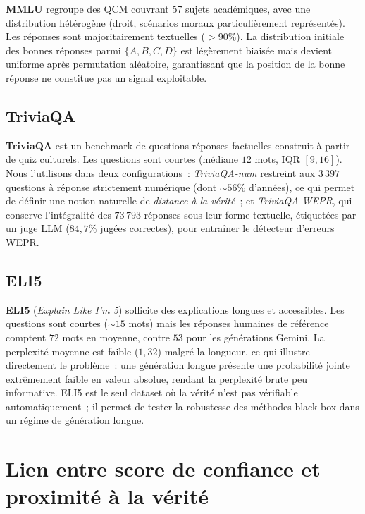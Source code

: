 \documentclass[12pt,a4paper]{article}
\begin{document}
\textbf{MMLU} regroupe des QCM couvrant 57 sujets académiques, avec une distribution hétérogène (droit, scénarios moraux particulièrement représentés). Les réponses sont majoritairement textuelles ($> 90\%$). La distribution initiale des bonnes réponses parmi $\{A,B,C,D\}$ est légèrement biaisée mais devient uniforme après permutation aléatoire, garantissant que la position de la bonne réponse ne constitue pas un signal exploitable.

\subsection{TriviaQA}

\textbf{TriviaQA} est un benchmark de questions-réponses factuelles construit à partir de quiz culturels. Les questions sont courtes (médiane $12$ mots, IQR $[9, 16]$). Nous l'utilisons dans deux configurations~: \emph{TriviaQA-num} restreint aux $3\,397$ questions à réponse strictement numérique (dont $\sim 56\%$ d'années), ce qui permet de définir une notion naturelle de \emph{distance à la vérité}~; et \emph{TriviaQA-WEPR}, qui conserve l'intégralité des $73\,793$ réponses sous leur forme textuelle, étiquetées par un juge LLM ($84{,}7\%$ jugées correctes), pour entraîner le détecteur d'erreurs WEPR.

\subsection{ELI5}

\textbf{ELI5} (\textit{Explain Like I'm 5}) sollicite des explications longues et accessibles. Les questions sont courtes ($\sim 15$ mots) mais les réponses humaines de référence comptent $72$ mots en moyenne, contre $53$ pour les générations Gemini. La perplexité moyenne est faible ($1{,}32$) malgré la longueur, ce qui illustre directement le problème~: une génération longue présente une probabilité jointe extrêmement faible en valeur absolue, rendant la perplexité brute peu informative. ELI5 est le seul dataset où la vérité n'est pas vérifiable automatiquement~; il permet de tester la robustesse des méthodes black-box dans un régime de génération longue.


\section{Lien entre score de confiance et proximité à la vérité}
\label{sec:confiance_verite}
\end{document}

